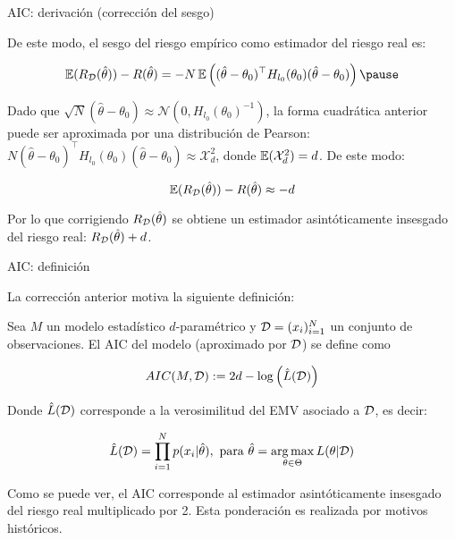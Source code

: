 \documentclass[9pt]{beamer}
\begin{document}
\begin{frame}{AIC: derivación (corrección del sesgo)}


De este modo, el sesgo del riesgo empírico como estimador del riesgo real es:

\begin{equation*}
	\E(R_\datos(\hat{\theta})) - R(\hat{\theta}) = -N \E\left((\hat{\theta}-\theta_0)^\top H_{l_0}(\theta_0) (\hat{\theta}-\theta_0)\right)\pause
\end{equation*}

Dado que $\sqrt{N}\left(\hat{\theta}-\theta_0\right)\approx\mathcal{N}\left(0,H_{l_0}(\theta_0)^{-1}\right)$, la forma cuadrática anterior puede ser aproximada por una distribución de Pearson: $N(\hat{\theta}-\theta_0)^\top H_{l_0}(\theta_0) (\hat{\theta}-\theta_0)\approx\mathcal{X}^2_d$, donde $\operatorname{\mathbb{E}}(\mathcal{X}^2_d)=d$. De este modo:

\begin{equation*}
	\operatorname{\mathbb{E}}(R_{\mathcal D}(\hat{\theta})) - R(\hat{\theta}) \approx -d
\end{equation*}\pause

Por lo que corrigiendo $R_{\mathcal D}(\hat{\theta})$ se obtiene un estimador asintóticamente insesgado del riesgo real: $R_{\mathcal D}(\hat{\theta})+d$.

\end{frame}

\begin{frame}{AIC: definición}

La corrección anterior motiva la siguiente definición:

\begin{definition}[AIC]
	Sea $M$ un modelo estadístico $d$-paramétrico y ${\mathcal D}=(x_i)_{i=1}^N$ un conjunto de observaciones. El AIC del modelo (aproximado por ${\mathcal D}$) se define como
	
	\begin{equation*}
		AIC(M,{\mathcal D}):=2d-\log\left(\hat{L}({\mathcal D})\right)
	\end{equation*}
	
	Donde $\hat{L}({\mathcal D})$ corresponde a la verosimilitud del EMV asociado a ${\mathcal D}$, es decir:
	
	\begin{equation*}
		\hat{L}({\mathcal D}) = \prod_{i=1}^N p(x_i|\hat{\theta}),\text{ para } \hat{\theta} = \operatorname*{arg\,max}_{\theta\in\Theta} L(\theta|{\mathcal D})
	\end{equation*}
\end{definition}\pause

Como se puede ver, el AIC corresponde al estimador asintóticamente insesgado del riesgo real multiplicado por 2. Esta ponderación es realizada por motivos históricos.
	
\end{frame}
\end{document}
